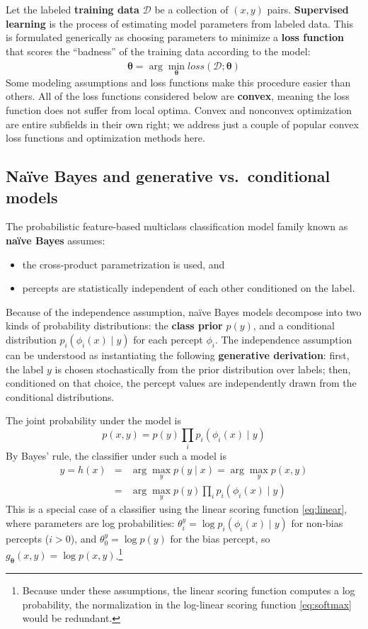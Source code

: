 \documentclass[11pt,letterpaper]{article}
\newcommand{\eref}[1]{\eqref{#1}}
\begin{document}
Let the labeled \textbf{training data} $\mathcal{D}$ be a collection of $(x,y)$ pairs.
\textbf{Supervised learning} is the process of estimating model parameters from labeled data.
This is formulated generically as choosing parameters to minimize a \textbf{loss function} that scores the 
``badness'' of the training data according to the model:
\begin{equation}
\hat{\boldsymbol{\theta}} = \arg\min_{\boldsymbol{\theta}} \textit{loss}(\mathcal{D}; \boldsymbol{\theta})
\end{equation}
Some modeling assumptions and loss functions make this procedure easier than others.
All of the loss functions considered below are \textbf{convex}, 
meaning the loss function does not suffer from local optima.
Convex and nonconvex optimization are entire subfields in their own right; 
we address just a couple of popular convex loss functions and optimization methods here.

\subsection{Na\"{i}ve Bayes and generative vs.~conditional models}

The probabilistic feature-based multiclass classification model family known as \textbf{na\"{i}ve Bayes} assumes:
\begin{itemize}
  \item the cross-product parametrization is used, and
  \item percepts are statistically independent of each other conditioned on the label.
\end{itemize}

Because of the independence assumption, na\"{i}ve Bayes models decompose into two kinds of probability distributions:
the \textbf{class prior} $p(y)$, and a conditional distribution $p_i(\phi_i(x) \mid y)$ for each percept $\phi_i$.
The independence assumption can be understood as instantiating the following \textbf{generative derivation}:
first, the label $y$ is chosen stochastically from the prior distribution over labels; 
then, conditioned on that choice, the percept values are independently drawn from the conditional distributions.

The joint probability under the model is
\begin{equation}
p(x,y) = p(y)\prod_i{p_i(\phi_i(x) \mid y)}
\end{equation}
By Bayes' rule, the classifier under such a model is
\begin{eqnarray}
\hat{y} = h(x) &=& \arg\max_y{p(y \mid x)} = \arg\max_y{p(x,y)} \\
               &=& \arg\max_y{p(y)\prod_i{p_i(\phi_i(x) \mid y)}}
\end{eqnarray}
This is a special case of a classifier using the linear scoring function \eref{eq:linear}, 
where parameters are log probabilities: $\theta^y_i = \log{p_i(\phi_i(x) \mid y)}$ for non-bias percepts ($i>0$), and 
$\theta^y_0 = \log{p(y)}$ for the bias percept, so $g_{\boldsymbol{\theta}}(x,y)=\log{p(x,y)}$.\footnote{Because under these assumptions, 
the linear scoring function computes a log probability, the normalization in the log-linear scoring function \eref{eq:softmax} would be redundant.}
\end{document}
